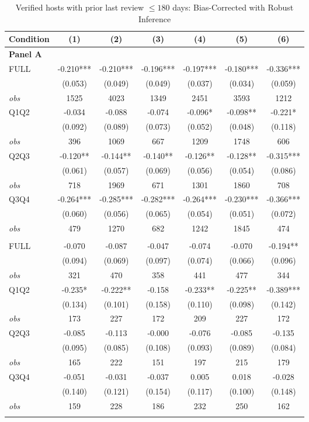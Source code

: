 \begin{table}[!htbp]
\centering
\caption{Verified hosts with prior last review $\leq180$ days: Bias-Corrected with Robust Inference}
\begin{tabular}{lcccccc}
\toprule
Condition & (1) & (2) & (3) & (4) & (5) & (6) \\
\midrule
\multicolumn{7}{l}{\textbf{Panel A}} \\

FULL & -0.210*** & -0.210*** & -0.196*** & -0.197*** & -0.180*** & -0.336*** \\
 & (0.053) & (0.049) & (0.049) & (0.037) & (0.034) & (0.059) \\
\textit{obs} & 1525 & 4023 & 1349 & 2451 & 3593 & 1212 \\
Q1Q2 & -0.034 & -0.088 & -0.074 & -0.096* & -0.098** & -0.221* \\
 & (0.092) & (0.089) & (0.073) & (0.052) & (0.048) & (0.118) \\
\textit{obs} & 396 & 1069 & 667 & 1209 & 1748 & 606 \\
Q2Q3 & -0.120** & -0.144** & -0.140** & -0.126** & -0.128** & -0.315*** \\
 & (0.061) & (0.057) & (0.069) & (0.056) & (0.054) & (0.086) \\
\textit{obs} & 718 & 1969 & 671 & 1301 & 1860 & 708 \\
Q3Q4 & -0.264*** & -0.285*** & -0.282*** & -0.264*** & -0.230*** & -0.366*** \\
 & (0.060) & (0.056) & (0.065) & (0.054) & (0.051) & (0.072) \\
\textit{obs} & 479 & 1270 & 682 & 1242 & 1845 & 474 \\
\addlinespace
\multicolumn{7}{l}{\textbf{Panel B}} \\

FULL & -0.070 & -0.087 & -0.047 & -0.074 & -0.070 & -0.194** \\
 & (0.094) & (0.069) & (0.097) & (0.074) & (0.066) & (0.096) \\
\textit{obs} & 321 & 470 & 358 & 441 & 477 & 344 \\
Q1Q2 & -0.235* & -0.222** & -0.158 & -0.233** & -0.225** & -0.389*** \\
 & (0.134) & (0.101) & (0.158) & (0.110) & (0.098) & (0.142) \\
\textit{obs} & 173 & 227 & 172 & 209 & 227 & 172 \\
Q2Q3 & -0.085 & -0.113 & -0.000 & -0.076 & -0.085 & -0.135 \\
 & (0.095) & (0.085) & (0.108) & (0.093) & (0.089) & (0.084) \\
\textit{obs} & 165 & 222 & 151 & 197 & 215 & 179 \\
Q3Q4 & -0.051 & -0.031 & -0.037 & 0.005 & 0.018 & -0.028 \\
 & (0.140) & (0.121) & (0.154) & (0.117) & (0.100) & (0.148) \\
\textit{obs} & 159 & 228 & 186 & 232 & 250 & 162 \\
\addlinespace
\multicolumn{7}{l}{\textbf{Panel C}} \\


\end{tabular}
\end{table}
